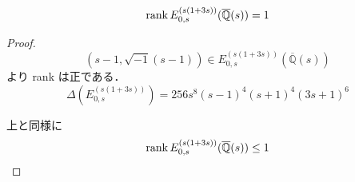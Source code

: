 \documentclass[main]{subfiles}
\begin{document}
\begin{thm}
    \begin{equation}
        \operatorname{rank} E_{0,s}^{(s(1 + 3s))}(\overline{\mathbb{Q}}(s)) = 1
    \end{equation}
\end{thm}
\begin{proof}
    \begin{equation}
        (s - 1, \sqrt{-1}(s - 1)) \in E_{0,s}^{(s(1 + 3s))}(\overline{\mathbb{Q}}(s))
    \end{equation}
    より rank は正である．
    \begin{equation}
        \Delta(E_{0,s}^{(s(1 + 3s))}) = 256s^{8}(s - 1)^{4}(s + 1)^{4}(3s + 1)^{6}
    \end{equation}

    上と同様に
    \begin{equation}
        \operatorname{rank} E_{0,s}^{(s(1 + 3s))}(\overline{\mathbb{Q}}(s)) \leq 1
    \end{equation}
\end{proof}
\end{document}
